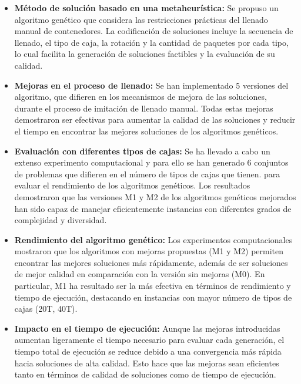 \documentclass[openany]{article}
\begin{document}
\begin{itemize}
    \item \textbf{Método de solución basado en una metaheurística:} Se propuso un algoritmo genético que considera las restricciones prácticas del llenado manual de contenedores. La codificación de soluciones incluye la secuencia de llenado, el tipo de caja, la rotación y la cantidad de paquetes por cada tipo, lo cual facilita la generación de soluciones factibles y la evaluación de su calidad.

    \item \textbf{Mejoras en el proceso de llenado:} Se han implementado 5 versiones del algoritmo, que difieren en los mecanismos de mejora de las soluciones, durante el proceso de imitación de llenado manual. Todas estas mejoras demostraron ser efectivas para aumentar la calidad de las soluciones y reducir el tiempo en encontrar las mejores soluciones de los algoritmos genéticos.

    \item \textbf{Evaluación con diferentes tipos de cajas:} Se ha llevado a cabo un extenso experimento computacional y para ello se han generado 6 conjuntos de problemas que difieren en el número de tipos de cajas que tienen. para evaluar el rendimiento de los algoritmos genéticos. Los resultados demostraron que las versiones M1 y M2 de los algoritmos genéticos mejorados han sido capaz de manejar eficientemente instancias con diferentes grados de complejidad y diversidad.

    \item \textbf{Rendimiento del algoritmo genético:} Los experimentos computacionales mostraron que los algoritmos con mejoras propuestas (M1 y M2) permiten encontrar las mejores soluciones más rápidamente, además de ser soluciones de mejor calidad en comparación con la versión sin mejoras (M0). En particular, M1 ha resultado ser la más efectiva en términos de rendimiento y tiempo de ejecución, destacando en instancias con mayor número de tipos de cajas (20T, 40T).

    \item \textbf{Impacto en el tiempo de ejecución:} Aunque las mejoras introducidas aumentan ligeramente el tiempo necesario para evaluar cada generación, el tiempo total de ejecución se reduce debido a una convergencia más rápida hacia soluciones de alta calidad. Esto hace que las mejoras sean eficientes tanto en términos de calidad de soluciones como de tiempo de ejecución.
\end{itemize}
\end{document}
